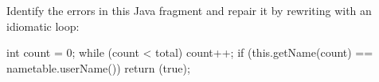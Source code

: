 \begin{exercise}
    Identify the errors in this Java fragment and repair it by rewriting
    with an idiomatic loop:
    \begin{badcode}
        int count = 0;
        while (count < total) {
            count++;
            if (this.getName(count) == nametable.userName()) {
                return (true);
            }
        }
    \end{badcode}
\end{exercise}
